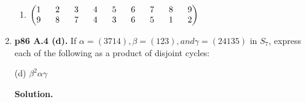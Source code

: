\documentclass[11pt]{article}
\begin{document}
\begin{enumerate}
\begin{enumerate}
		\item 
		$\begin{pmatrix}
			1 \hspace{6mm} 2 \hspace{6mm} 3 \hspace{6mm} 4 \hspace{6mm} 5 \hspace{6mm} 6 \hspace{6mm} 7 \hspace{6mm} 8 \hspace{6mm} 9 \\
			9 \hspace{6mm} 8 \hspace{6mm} 7 \hspace{6mm} 4 \hspace{6mm} 3 \hspace{6mm} 6 \hspace{6mm} 5 \hspace{6mm} 1 \hspace{6mm} 2
		\end{pmatrix}$
  
  \end{enumerate}

\item {\bfseries p86 A.4 (d).} If $\alpha = (3714), \beta = (123), and \gamma = (24135)$ in $S_7$, express each of the following as a product of disjoint cycles:

	(d) $\beta^2\alpha\gamma$
  
	{\bfseries Solution.}
  
\newpage

\end{enumerate}
\end{document}
